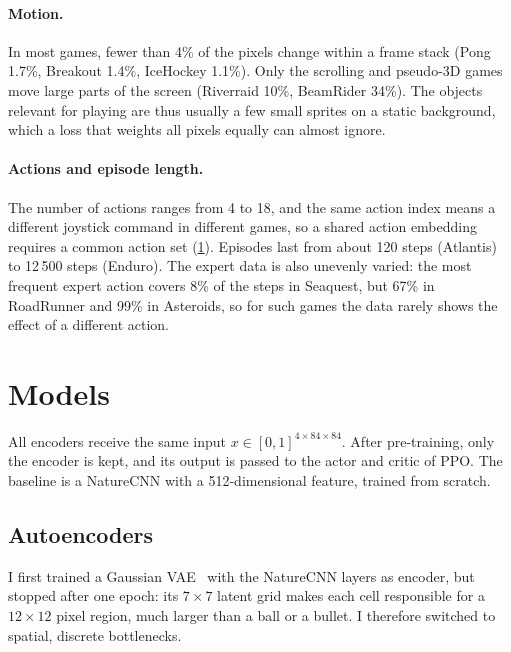 \documentclass[runningheads]{llncs}
\begin{document}
\paragraph{Motion.} In most games, fewer than 4\% of the pixels change within a frame stack
(Pong 1.7\%, Breakout 1.4\%, IceHockey 1.1\%). Only the scrolling and pseudo-3D games move large
parts of the screen (Riverraid 10\%, BeamRider 34\%). The objects relevant for playing are thus usually a few small sprites on a static background,
which a loss that weights all pixels equally can almost ignore.

\paragraph{Actions and episode length.} The number of actions ranges from 4 to 18, and the same
action index means a different joystick command in different games, so a shared action
embedding requires a common action set (\cref{sec:models}). Episodes last from about
120 steps (Atlantis) to 12\,500 steps (Enduro). The expert data is also unevenly varied: the most frequent expert action covers 8\% of the
steps in Seaquest, but 67\% in RoadRunner and 99\% in Asteroids, so for such games the data
rarely shows the effect of a different action.

\section{Models}
\label{sec:models}

All encoders receive the same input $x\in[0,1]^{4\times84\times84}$. After pre-training, only the encoder is kept, and its output is passed to the actor and critic
of PPO. The baseline is a NatureCNN with a 512-dimensional feature, trained
from scratch.

\FloatBarrier
\subsection{Autoencoders}

I first trained a Gaussian VAE~\cite{kingma2014vae} with the NatureCNN layers as encoder,
but stopped after one epoch: its $7\times7$ latent grid makes each cell responsible for a
$12\times12$ pixel region, much larger than a ball or a bullet. I therefore switched to spatial,
discrete bottlenecks.
\end{document}
